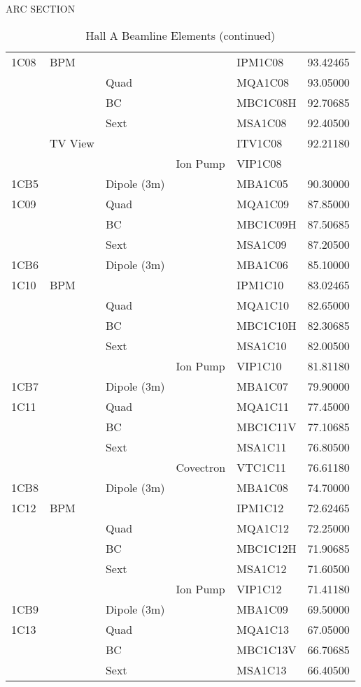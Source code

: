 \begin{table}[hp]
\caption[Beamline: Hall A Beamline Elements]{Hall A Beamline Elements (continued)}
\label{beam_tab1b3}
\noindent ARC SECTION 

\begin{tabular}{lllllr} \hline
1C08 & BPM &&& IPM1C08 & 93.42465 \\
&& Quad && MQA1C08 & 93.05000 \\
&& BC && MBC1C08H & 92.70685 \\
&& Sext && MSA1C08 & 92.40500 \\
& TV View &&& ITV1C08 & 92.21180 \\
&&& Ion Pump & VIP1C08 & \\
1CB5 && Dipole (3m) && MBA1C05 & 90.30000 \\
1C09 && Quad && MQA1C09 & 87.85000 \\
&& BC && MBC1C09H & 87.50685 \\
&& Sext && MSA1C09 & 87.20500 \\
1CB6 && Dipole (3m) && MBA1C06 & 85.10000 \\
1C10 & BPM &&& IPM1C10 & 83.02465 \\
&& Quad && MQA1C10 & 82.65000 \\
&& BC && MBC1C10H & 82.30685 \\
&& Sext && MSA1C10 & 82.00500 \\
&&& Ion Pump & VIP1C10 & 81.81180 \\
1CB7 && Dipole (3m) && MBA1C07 & 79.90000 \\
1C11 && Quad && MQA1C11 & 77.45000 \\
&& BC && MBC1C11V & 77.10685 \\
&& Sext && MSA1C11 & 76.80500 \\
&&& Covectron & VTC1C11 & 76.61180 \\
1CB8 && Dipole (3m) && MBA1C08 & 74.70000 \\
1C12 & BPM &&& IPM1C12 & 72.62465 \\
&& Quad && MQA1C12 & 72.25000 \\
&& BC && MBC1C12H & 71.90685 \\
&& Sext && MSA1C12 & 71.60500 \\
&&& Ion Pump & VIP1C12 & 71.41180 \\
1CB9 && Dipole (3m) && MBA1C09 & 69.50000 \\
1C13 && Quad && MQA1C13 & 67.05000 \\
&& BC && MBC1C13V & 66.70685 \\
&& Sext && MSA1C13 & 66.40500 \\

\end{tabular}
\end{table}
